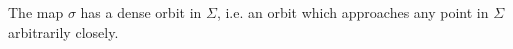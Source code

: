 \begin{proposition}[]
	The map $\sigma$ has a dense orbit in $\Sigma$, i.e. an orbit which approaches any point in $\Sigma$ arbitrarily closely.
\end{proposition}
%
%
